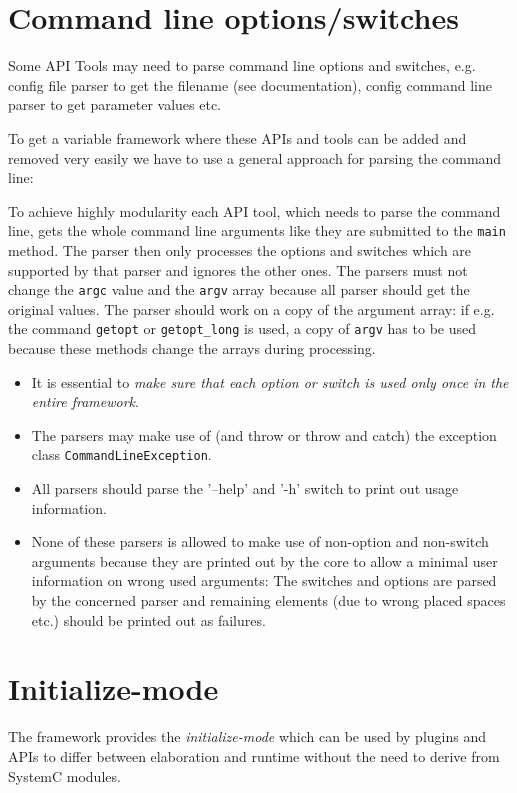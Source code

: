 \section{Command line options/switches}
Some API Tools may need to parse command line options and switches, e.g. config file parser to get the filename (see \GreenConfig documentation), config command line parser to get parameter values etc.

To get a variable framework where these APIs and tools can be added and removed very easily we have to use a general approach for parsing the command line: 

To achieve highly modularity each API tool, which needs to parse the command line, gets the whole command line arguments like they are submitted to the \lstinline|main| method. The parser then only processes the options and switches which are supported by that parser and ignores the other ones. The parsers must not change the \lstinline|argc| value and the \lstinline|argv| array because all parser should get the original values. The parser should work on a copy of the argument array: if e.g. the command \lstinline|getopt| or \lstinline|getopt_long| is used, a copy of \lstinline|argv| has to be used because these methods change the arrays during processing. 

\begin{itemize}
	\item It is essential to {\em make sure that each option or switch is used only once in the entire framework}. 

	\item The parsers may make use of (and throw or throw and catch) the exception class \lstinline|CommandLineException|. 

	\item All parsers should parse the '--help' and '-h' switch to print out usage information. 
	
	\item None of these parsers is allowed to make use of non-option and non-switch arguments because they are printed out by the core to allow a minimal user information on wrong used
arguments: The switches and options are parsed by the concerned parser and remaining elements (due to wrong placed spaces etc.) should be printed out as failures. 
\end{itemize}


\section{Initialize-mode}
\label{InitializeMode}
The \GreenControl framework provides the {\em initialize-mode} which can be used by plugins and APIs to differ between elaboration and runtime without the need to derive from SystemC modules.


